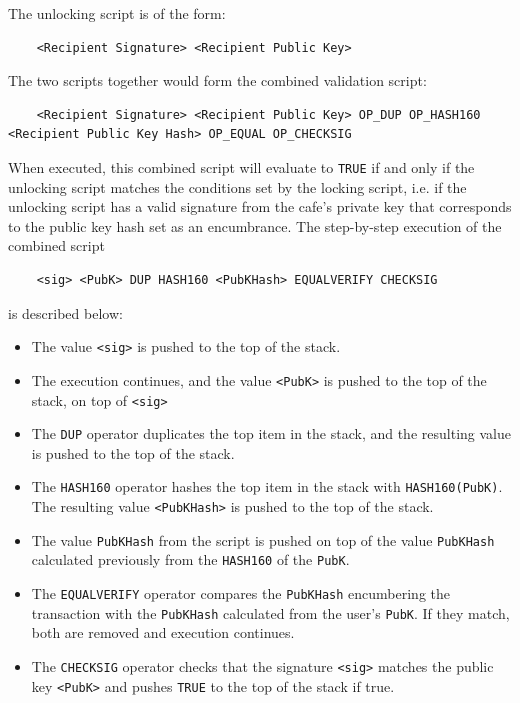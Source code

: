 \documentclass{article}
\begin{document}
    The unlocking script is of the form:

    \begin{lstlisting}
    <Recipient Signature> <Recipient Public Key>
    \end{lstlisting}

    The two scripts together would form the combined validation script:

    \begin{lstlisting}
    <Recipient Signature> <Recipient Public Key> OP_DUP OP_HASH160 <Recipient Public Key Hash> OP_EQUAL OP_CHECKSIG
    \end{lstlisting}

    When executed, this combined script will evaluate to \texttt{TRUE} if and only if the unlocking script matches the conditions set by the locking script, i.e. if the unlocking script has a valid signature from the cafe's private key that corresponds to the public key hash set as an encumbrance. The step-by-step execution of the combined script

    \begin{lstlisting}
    <sig> <PubK> DUP HASH160 <PubKHash> EQUALVERIFY CHECKSIG
    \end{lstlisting}

    is described below:

    \begin{itemize}
      \item The value \texttt{<sig>} is pushed to the top of the stack.
      \item The execution continues, and the value \texttt{<PubK>} is pushed to the top of the stack, on top of \texttt{<sig>}
      \item The \texttt{DUP} operator duplicates the top item in the stack, and the resulting value is pushed to the top of the stack.
      \item The \texttt{HASH160} operator hashes the top item in the stack with \texttt{HASH160(PubK)}. The resulting value \texttt{<PubKHash>} is pushed to the top of the stack.
      \item The value \texttt{PubKHash} from the script is pushed on top of the value \texttt{PubKHash} calculated previously from the \texttt{HASH160} of the \texttt{PubK}.
      \item The \texttt{EQUALVERIFY} operator compares the \texttt{PubKHash} encumbering the transaction with the \texttt{PubKHash} calculated from the user's \texttt{PubK}. If they match, both are removed and execution continues.
      \item The \texttt{CHECKSIG} operator checks that the signature \texttt{<sig>} matches the public key \texttt{<PubK>} and pushes \texttt{TRUE} to the top of the stack if true.
    \end{itemize}
\end{document}
